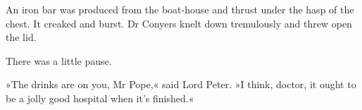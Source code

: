 An iron bar was produced from the boat-house and thrust under the hasp of the chest. It creaked and burst. Dr Conyers knelt down tremulously and threw open the lid.

There was a little pause.

»The drinks are on you, Mr Pope,« said Lord Peter. »I think, doctor, it ought to be a jolly good hospital when it's finished.«